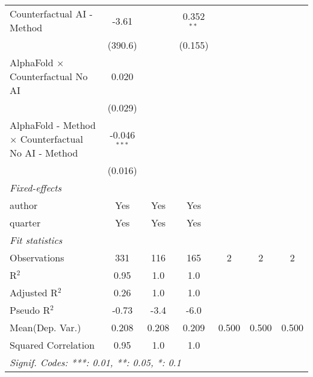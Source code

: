 \begin{tabular}{lcccccc}
   Counterfactual AI - Method                                 & -3.61          &               & 0.352$^{**}$   &     &     &   \\   
                                                              & (390.6)        &               & (0.155)        &     &     &   \\   
   AlphaFold $\times$ Counterfactual No AI                    & 0.020          &               &                &     &     &   \\   
                                                              & (0.029)        &               &                &     &     &   \\   
   AlphaFold - Method $\times$ Counterfactual No AI - Method  & -0.046$^{***}$ &               &                &     &     &   \\   
                                                              & (0.016)        &               &                &     &     &   \\   
   \midrule
   \emph{Fixed-effects}\\
   author                                                     & Yes            & Yes           & Yes            &     &     & \\  
   quarter                                                    & Yes            & Yes           & Yes            &     &     & \\  
   \midrule
   \emph{Fit statistics}\\
   Observations                                               & 331            & 116           & 165            & 2   & 2   & 2\\  
   R$^2$                                                      & 0.95           & 1.0           & 1.0            &     &     & \\  
   Adjusted R$^2$                                             & 0.26           & 1.0           & 1.0            &     &     & \\  
   Pseudo R$^2$                                               & -0.73          & -3.4          & -6.0           &     &     & \\  
Mean(Dep. Var.) & 0.208 & 0.208 & 0.209 & 0.500 & 0.500 & 0.500 \\
   Squared Correlation                                        & 0.95           & 1.0           & 1.0            &     &     & \\  
   \midrule \midrule
   \multicolumn{7}{l}{\emph{Signif. Codes: ***: 0.01, **: 0.05, *: 0.1}}\\
\end{tabular}
\par\endgroup
